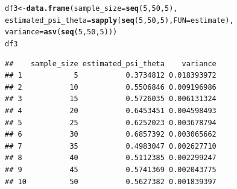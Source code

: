 \documentclass[11pt, a4paper]{article}\usepackage[]{graphicx}\usepackage[]{xcolor}
\makeatletter
\newcommand{\hlnum}[1]{\textcolor[rgb]{0.686,0.059,0.569}{#1}}%
\newcommand{\hldef}[1]{\textcolor[rgb]{0.345,0.345,0.345}{#1}}%
\newcommand{\hlkwb}[1]{\textcolor[rgb]{0.69,0.353,0.396}{#1}}%
\newcommand{\hlkwc}[1]{\textcolor[rgb]{0.333,0.667,0.333}{#1}}%
\newcommand{\hlkwd}[1]{\textcolor[rgb]{0.737,0.353,0.396}{\textbf{#1}}}%
\newenvironment{kframe}{%
 \def\at@end@of@kframe{}%
 \ifinner\ifhmode%
  \def\at@end@of@kframe{\end{minipage}}%
  \begin{minipage}{\columnwidth}%
 \fi\fi%
 \def\FrameCommand##1{\hskip\@totalleftmargin \hskip-\fboxsep
 \colorbox{shadecolor}{##1}\hskip-\fboxsep
     \hskip-\linewidth \hskip-\@totalleftmargin \hskip\columnwidth}%
 \MakeFramed {\advance\hsize-\width
   \@totalleftmargin\z@ \linewidth\hsize
   \@setminipage}}%
 {\par\unskip\endMakeFramed%
 \at@end@of@kframe}
\newenvironment{knitrout}{}{} %
\makeatother
\begin{document}
\begin{knitrout}
\color{fgcolor}\begin{kframe}
\begin{alltt}
\hldef{df3} \hlkwb{<-} \hlkwd{data.frame}\hldef{(}\hlkwc{sample_size} \hldef{=} \hlkwd{seq}\hldef{(}\hlnum{5}\hldef{,} \hlnum{50}\hldef{,} \hlnum{5}\hldef{),}
                  \hlkwc{estimated_psi_theta} \hldef{=} \hlkwd{sapply}\hldef{(}\hlkwd{seq}\hldef{(}\hlnum{5}\hldef{,} \hlnum{50}\hldef{,} \hlnum{5}\hldef{),} \hlkwc{FUN} \hldef{= estimate),}
                  \hlkwc{variance} \hldef{=} \hlkwd{asv}\hldef{(}\hlkwd{seq}\hldef{(}\hlnum{5}\hldef{,} \hlnum{50}\hldef{,} \hlnum{5}\hldef{)))}
\hldef{df3}
\end{alltt}
\begin{verbatim}
##    sample_size estimated_psi_theta    variance
## 1            5           0.3734812 0.018393972
## 2           10           0.5506846 0.009196986
## 3           15           0.5726035 0.006131324
## 4           20           0.6453451 0.004598493
## 5           25           0.6252023 0.003678794
## 6           30           0.6857392 0.003065662
## 7           35           0.4983047 0.002627710
## 8           40           0.5112385 0.002299247
## 9           45           0.5741369 0.002043775
## 10          50           0.5627382 0.001839397
\end{verbatim}
\end{kframe}
\end{knitrout}

\end{document}
